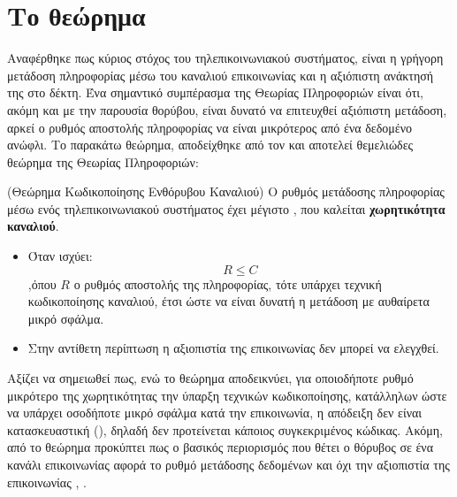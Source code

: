 \section{Το θεώρημα }
Αναφέρθηκε πως κύριος στόχος του τηλεπικοινωνιακού συστήματος, είναι η γρήγορη μετάδοση πληροφορίας μέσω του καναλιού επικοινωνίας και η αξιόπιστη ανάκτησή της στο δέκτη. Ένα σημαντικό συμπέρασμα της Θεωρίας Πληροφοριών είναι ότι, ακόμη και με την παρουσία θορύβου, είναι δυνατό να επιτευχθεί αξιόπιστη μετάδοση, αρκεί ο ρυθμός αποστολής πληροφορίας να είναι μικρότερος από ένα δεδομένο ανώφλι. Το παρακάτω θεώρημα, αποδείχθηκε από τον  και αποτελεί θεμελιώδες θεώρημα της Θεωρίας Πληροφοριών:

\begin{theorem}(Θεώρημα Κωδικοποίησης Ενθόρυβου Καναλιού)
Ο ρυθμός μετάδοσης πληροφορίας μέσω ενός τηλεπικοινωνιακού συστήματος έχει μέγιστο , που καλείται \textbf{χωρητικότητα καναλιού}.
\begin{itemize}
\item Όταν ισχύει:
\begin{equation}
R\leq{C}
\end{equation}
,όπου $R$ ο ρυθμός αποστολής της πληροφορίας, τότε υπάρχει τεχνική κωδικοποίησης καναλιού, έτσι ώστε να είναι δυνατή η μετάδοση με αυθαίρετα μικρό σφάλμα.
\item Στην αντίθετη περίπτωση η αξιοπιστία της επικοινωνίας δεν μπορεί να ελεγχθεί.
\end{itemize}
\label{theorem:shannon}
\end{theorem}


Αξίζει να σημειωθεί πως, ενώ το θεώρημα  αποδεικνύει, για οποιοδήποτε ρυθμό μικρότερο της χωρητικότητας την ύπαρξη τεχνικών κωδικοποίησης, κατάλληλων ώστε να υπάρχει οσοδήποτε μικρό σφάλμα κατά την επικοινωνία, η απόδειξη δεν είναι κατασκευαστική (), δηλαδή δεν προτείνεται κάποιος συγκεκριμένος κώδικας. Ακόμη, από το θεώρημα προκύπτει πως ο βασικός περιορισμός που θέτει ο θόρυβος σε ένα κανάλι επικοινωνίας αφορά το ρυθμό μετάδοσης δεδομένων και όχι την αξιοπιστία της επικοινωνίας \cite{proakis1994communication}, \cite{shannon1948mathematical}.

